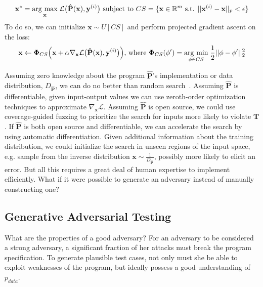 %
\begin{equation}
\mathbf{x}^* = \underset{\mathbf{x}}{\operatorname{arg}\,\operatorname{max}}\;\mathcal{L}\big(\mathbf{\hat P}(\mathbf{x}), \mathbf{y}^{(i)}\big) \text{ subject to } CS = \{\mathbf{x} \in \mathbb{R}^m \text{ s.t. } ||\mathbf{x}^{(i)} - \mathbf{x}||_p    < \epsilon\}
\end{equation}
%
To do so, we can initialize $\mathbf{x} \sim U[CS]$ and perform projected gradient ascent on the loss:
%
\begin{equation}\label{eq:projected_gd}
\mathbf x \leftarrow \bm\Phi_{CS}\Big(\mathbf x + \alpha\mathbf\nabla_{\mathbf x} \mathcal{L}\big(\mathbf{\hat P}(\mathbf{x}), \mathbf{y}^{(i)}\big)\Big) \text{, where }
\bm\Phi_{CS}(\mathbf \phi') = \underset{\mathbf \phi \in CS}{\operatorname{arg}\,\operatorname{min}}\;\frac{1}{2}||\mathbf \phi - \mathbf \phi'||^2_2
\end{equation}
%

Assuming zero knowledge about the program $\mathbf{\hat P}$'s implementation or data distribution, $D_{\mathbf{\hat P}}$, we can do no better than random search~\citep{wolpert1997no}. Assuming $\mathbf{\hat P}$ is differentiable, given input-output values we can use zeroth-order optimization techniques to approximate $\nabla_{\mathbf{x}}\mathcal{L}$. Assuming $\mathbf{\hat P}$ is open source, we could use coverage-guided fuzzing to prioritize the search for inputs more likely to violate $\mathbf T$. If $\mathbf{\hat P}$ is both open source and differentiable, we can accelerate the search by using automatic differentiation. Given additional information about the training distribution, we could initialize the search in unseen regions of the input space, e.g. sample from the inverse distribution $\mathbf x \sim \frac{1}{D_{\mathbf{\hat P}}}$, possibly more likely to elicit an error. But all this requires a great deal of human expertise to implement efficiently. What if it were possible to generate an adversary instead of manually constructing one?

\subsection{Generative Adversarial Testing}

What are the properties of a good adversary? For an adversary to be considered a strong adversary, a significant fraction of her attacks must break the program specification. To generate plausible test cases, not only must she be able to exploit weaknesses of the program, but ideally possess a good understanding of $p_{data}$.

